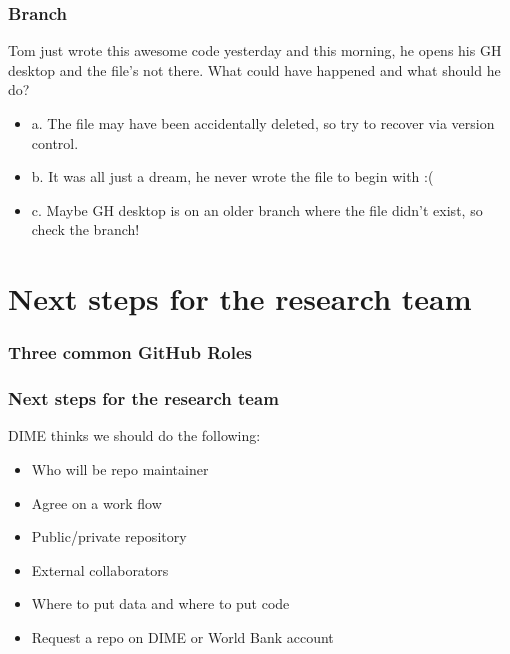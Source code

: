 \documentclass[aspectratio=169]{beamer} %
\begin{document}
\begin{frame}
\frametitle{Branch}

	Tom just wrote this awesome code yesterday and this morning, he opens his GH desktop and the file's
	not there. What could have happened and what should he do?

	\begin{itemize}
		\item a. The file may have been accidentally deleted, so try to recover via version control.
		\item b. It was all just a dream, he never wrote the file to begin with :(
		\item c. Maybe GH desktop is on an older branch where the file didn't exist, so check the branch!
	\end{itemize}


\end{frame}

\section{Next steps for the research team}

\begin{frame}
\frametitle{Three common GitHub Roles}

	

\end{frame}

\begin{frame}
\frametitle{Next steps for the research team}

	DIME thinks we should do the following:

	\begin{itemize}
		\item Who will be repo maintainer
		\item Agree on a work flow
		\item Public/private repository
		\item External collaborators
		\item Where to put data and where to put code
		\item Request a repo on DIME or World Bank account
	\end{itemize}

\end{frame}




\end{document}

